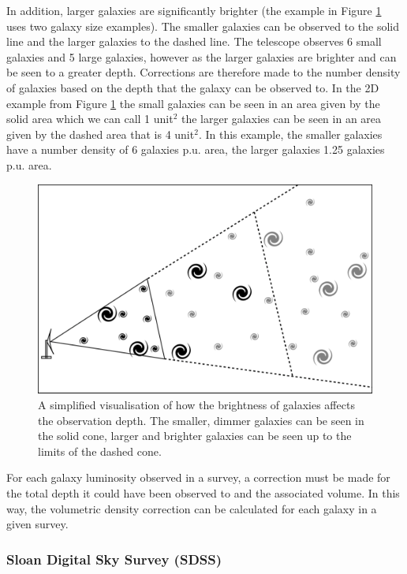 In addition, larger galaxies are significantly brighter (the example in Figure \ref{fig:Vmax} uses two galaxy size examples). The smaller galaxies can be observed to the solid line and the larger galaxies to the dashed line. The telescope observes 6 small galaxies and 5 large galaxies, however as the larger galaxies are brighter and can be seen to a greater depth. Corrections are therefore made to the number density of galaxies based on the depth that the galaxy can be observed to. In the 2D example from Figure \ref{fig:Vmax} the small galaxies can be seen in an area given by the solid area which we can call 1 unit$^2$ the larger galaxies can be seen in an area given by the dashed area that is 4 unit$^2$. In this example, the smaller galaxies have a number density of 6 galaxies p.u. area, the larger galaxies 1.25 galaxies p.u. area.

\begin{figure}[h]
    \centering
    \includegraphics[width = \linewidth]{Figures/Chapter1/Vmax_Toon.png}
    \caption{A simplified visualisation of how the brightness of galaxies affects the observation depth. The smaller, dimmer galaxies can be seen in the solid cone, larger and brighter galaxies can be seen up to the limits of the dashed cone.}
    \label{fig:Vmax}
\end{figure}

For each galaxy luminosity observed in a survey, a correction must be made for the total depth it could have been observed to and the associated volume. In this way, the volumetric density correction can be calculated for each galaxy in a given survey.

\subsubsection{Sloan Digital Sky Survey (SDSS)}

